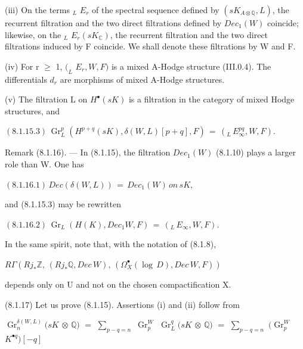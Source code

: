 \documentclass[11pt,twoside]{article}
\newcommand{\DFormula}[1]{%
  \par\smallskip\noindent\hspace*{0pt}\(\displaystyle #1\)\par\smallskip
}
\begin{document}
(iii) On the terms \(_{L}\) \(E_{r}\) of the spectral sequence defined by \((sK_{A\otimes \mathbb{Q}},L)\), the recurrent filtration and the two direct filtrations defined by \(Dec_{1}(W)\) coincide; likewise, on the \(_{L}\) \(E_{r}(sK_{\mathbb{C}})\), the recurrent filtration and the two direct filtrations induced by F coincide. We shall denote these filtrations by W and F.\par
\par\medskip
(iv) For r \(\geq \) 1, \((_{L}\) \(E_{r},W,F)\) is a mixed A-Hodge structure (III.0.4). The differentials \(d_{r}\) are morphisms of mixed A-Hodge structures.\par
\par\medskip
(v) The filtration L on \(H^{\bullet }(sK)\) is a filtration in the category of mixed Hodge structures, and\par
\par\medskip
\DFormula{(8.1.15.3)\,\operatorname{Gr}_{L}^{p}(H^{p+q}(sK),\delta (W,L)[p+q],F)\,=\,(_{L}\,E_{\infty }^{pq},W,F).}
\par\medskip
Remark (8.1.16). — In (8.1.15), the filtration \(Dec_{1}(W)\) (8.1.10) plays a larger role than W. One has\par
\par\medskip
\DFormula{(8.1.16.1)\,Dec(\delta (W,L))\,=\,Dec_{1}(W)\,on\,sK,}
\par\medskip
and (8.1.15.3) may be rewritten\par
\par\medskip
\DFormula{(8.1.16.2)\,\operatorname{Gr}_{L}(H(K),Dec_{1}W,F)\,=\,(_{L}\,E_{\infty },W,F).}
\par\medskip
In the same spirit, note that, with the notation of (8.1.8),\par
\par\medskip
\DFormula{R\Gamma (Rj_{\ast }\mathbb{Z},\,(Rj_{\ast }\mathbb{Q},Dec\,W),\,(\Omega _{X}^{\bullet }(\operatorname{log}\,D),Dec\,W,F))}
\par\medskip
depends only on U and not on the chosen compactification X.\par
\par\medskip
(8.1.17) Let us prove (8.1.15). Assertions (i) and (ii) follow from\par
\par\medskip
\(\operatorname{Gr}_{n}^{\delta (W,L)}(sK\) \(\otimes \) \(\mathbb{Q})\) \(=\) \(\sum _{p−q=n}\) \(\operatorname{Gr}_{p}^{W}\) \(\operatorname{Gr}_{L}^{q}(sK\) \(\otimes \) \(\mathbb{Q})\) \(=\) \(\sum _{p−q=n}\) \((\operatorname{Gr}_{p}^{W}\) \(K^{\bullet q})[−q]\)\par
\end{document}
